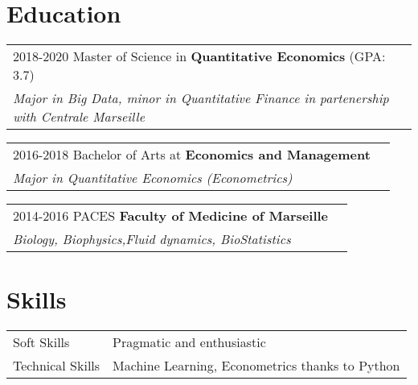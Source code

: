 \documentclass[a4paper,12pt]{article}
\begin{document}
\section{Education}
\begin{tabularx}{\linewidth}{@{}l X@{}}	
2018-2020 Master of Science in \textbf{Quantitative Economics} \hfill \normalsize (GPA: 3.7) \\
\textit{Major in Big Data, minor in Quantitative Finance in partenership with Centrale Marseille }
\end{tabularx}


\begin{tabularx}{\linewidth}{@{}l X@{}}	
2016-2018 Bachelor of Arts at \textbf{Economics and Management} \hfill \normalsize \\
\textit{Major in Quantitative Economics (Econometrics)}
\end{tabularx}

\begin{tabularx}{\linewidth}{@{}l X@{}}	
2014-2016 PACES \textbf{Faculty of Medicine of Marseille} \hfill \normalsize \\
\textit{Biology, Biophysics,Fluid dynamics, BioStatistics}
\end{tabularx}
\section{Skills}
\begin{tabularx}{\linewidth}{@{}l X@{}}
Soft Skills &  \normalsize{Pragmatic and enthusiastic}\\
Technical Skills  &  \normalsize{ Machine Learning, Econometrics thanks to Python}\\  
\end{tabularx}
\end{document}
